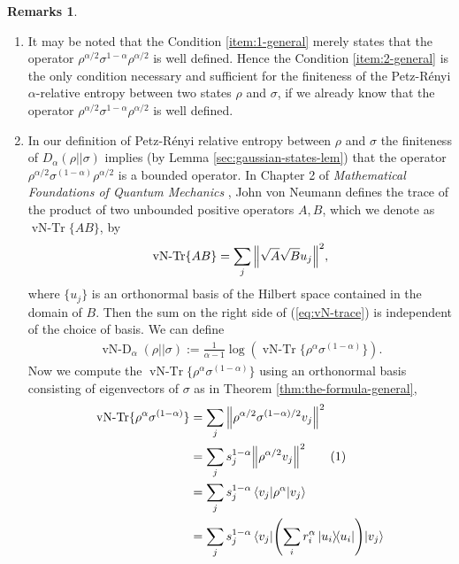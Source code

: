 \documentclass[12pt,a4paper,oneside]{article}
\numberwithin{equation}{section}
\theoremstyle{definition}  %
\newtheorem{rmks}[defn]{Remarks}
\theoremstyle{plain}  %
\theoremstyle{remark} %
\newcommand{\numberthis}{\refstepcounter{equation}\tag{\theequation}}
\begin{document}
 \begin{rmks}\begin{enumerate}\item It may be noted that the Condition \ref{item:1-general} merely states that the operator  $\rho^{\alpha/2}\sigma^{1-\alpha}\rho^{\alpha/2}$ is well defined. Hence the Condition \ref{item:2-general} is the only condition necessary and sufficient for the finiteness of the Petz-R\'enyi $\alpha$-relative entropy between two states $\rho$ and $\sigma$, if we already know that the operator  $\rho^{\alpha/2}\sigma^{1-\alpha}\rho^{\alpha/2}$ is well defined.
     \item 
 In our definition of Petz-R\'enyi relative entropy between $\rho$
and $\sigma$ the finiteness of $D_\alpha(\rho||\sigma)$ implies (by Lemma \ref{sec:gaussian-states-lem}) that the operator $\rho^{\alpha/2}\sigma^{(1-\alpha)}\rho^{\alpha/2}$ is a bounded operator. In Chapter 2 of  \emph{Mathematical Foundations of Quantum Mechanics} 
\cite{vN2018}, John von Neumann defines the trace of the product of two unbounded positive operators $A,B$,  which we denote as $\operatorname{vN-Tr} \{AB\}$,  by \begin{align}\label{eq:vN-trace}
    \operatorname{vN-Tr} \{AB\} = \sum\limits_j \norm{\sqrt{A}\sqrt{B}u_j}^2,
\end{align}
where $\{u_j\}$ is an orthonormal basis of the Hilbert space contained
in the domain of $B$. Then the sum on the right side of (\ref{eq:vN-trace}) is independent of the choice of basis. We can define  \begin{align*}
    \operatorname{vN-D}_{\alpha}(\rho||\sigma) := \frac{1}{\alpha-1}\log \left(\operatorname{vN-Tr} \{\rho^{\alpha}\sigma^{(1-\alpha)}\}\right).
\end{align*}
 Now we compute the $\operatorname{vN-Tr} \{\rho^{\alpha}\sigma^{(1-\alpha)}\}$ using an orthonormal basis consisting of eigenvectors of $\sigma$ as in Theorem \ref{thm:the-formula-general},
  \begin{align*}
     \operatorname{vN-Tr} \{\rho^{\alpha}\sigma^{(1-\alpha)}\}  &=\sum\limits_{j} \norm{\rho^{\alpha/2}\sigma^{(1-\alpha)/2}v_j}^2\\
     & = \sum\limits_{j}
       s_j^{1-\alpha}\norm{\rho^{\alpha/2}v_j}^2\numberthis
       \label{eq:alternate-formula}\\
     & = \sum\limits_{j}
       s_j^{1-\alpha}\mel{v_j}{\rho^{\alpha}}{v_j}\\
     & = \sum\limits_{j}
       s_j^{1-\alpha}\mel{v_j}{\left(\sum\limits_ir_i^{\alpha}\ketbra{u_i}\right)}{v_j}\\

\end{align*}
\end{enumerate}
\end{rmks}
\end{document}

